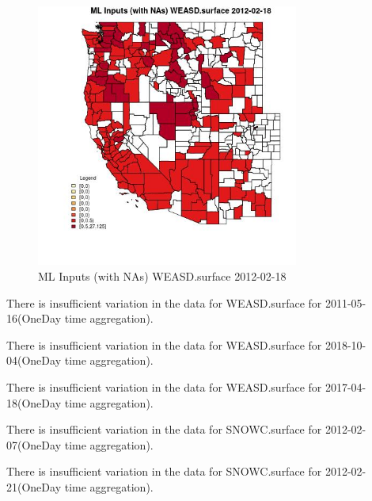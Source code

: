 \begin{figure} 
\centering  
\includegraphics[width=0.77\textwidth]{Code_Outputs/Report_ML_input_PM25_Step4_part_f_de_duplicated_aves_prioritize_24hr_obswNAs_CountyWEASDsurfaceMean2012-02-18.jpg} 
\caption{\label{fig:Report_ML_input_PM25_Step4_part_f_de_duplicated_aves_prioritize_24hr_obswNAsCountyWEASDsurfaceMean2012-02-18}ML Inputs (with NAs) WEASD.surface 2012-02-18} 
\end{figure} 
 

There is insufficient variation in the data for WEASD.surface for 2011-05-16(OneDay time aggregation). 
 

There is insufficient variation in the data for WEASD.surface for 2018-10-04(OneDay time aggregation). 
 

There is insufficient variation in the data for WEASD.surface for 2017-04-18(OneDay time aggregation). 
 

There is insufficient variation in the data for SNOWC.surface for 2012-02-07(OneDay time aggregation). 
 

There is insufficient variation in the data for SNOWC.surface for 2012-02-21(OneDay time aggregation). 
 

\clearpage 

